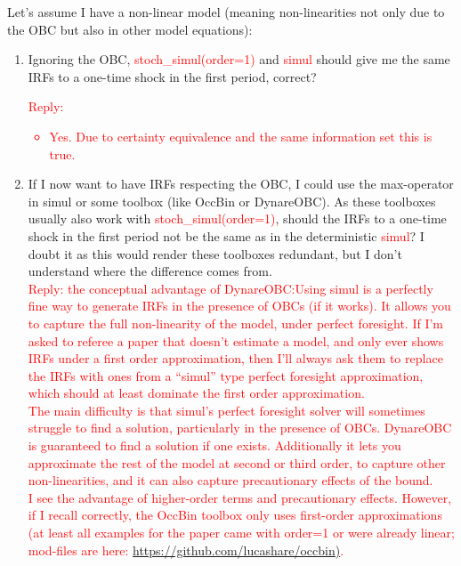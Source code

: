 \documentclass[10pt,math=newtx,citestyle=gb7714-2015,bibstyle=gb7714-2015]{elegantbook}
\begin{document}
{{{	Let’s assume I have a non-linear model (meaning non-linearities not only due to the OBC but also in other model equations):\\
	\begin{enumerate}
		\item  Ignoring the OBC, \textcolor{red}{stoch\_simul(order=1)} and \textcolor{red}{simul} should give me the same IRFs to a one-time shock in the first period, correct?\\
		\textcolor{red}{Reply:
			\begin{itemize}
				\item Yes. Due to certainty equivalence and the same information set this is true.
			\end{itemize}
		}
		\item If I now want to have IRFs respecting the OBC, I could use the max-operator in simul or some toolbox (like OccBin or DynareOBC). As these toolboxes usually also work with \textcolor{red}{stoch\_simul(order=1)}, should the IRFs to a one-time shock in the first period not be the same as in the deterministic \textcolor{red}{simul}? I doubt it as this would render these toolboxes redundant, but I don’t understand where the difference comes from.\\
		\textcolor{red}{Reply: the conceptual advantage of DynareOBC:Using simul is a perfectly fine way to generate IRFs in the presence of OBCs (if it works). It allows you to capture the full non-linearity of the model, under perfect foresight. If I’m asked to referee a paper that doesn’t estimate a model, and only ever shows IRFs under a first order approximation, then I’ll always ask them to replace the IRFs with ones from a “simul” type perfect foresight approximation, which should at least dominate the first order approximation.\\
			The main difficulty is that simul’s perfect foresight solver will sometimes struggle to find a solution, particularly in the presence of OBCs. DynareOBC is guaranteed to find a solution if one exists. Additionally it lets you approximate the rest of the model at second or third order, to capture other non-linearities, and it can also capture precautionary effects of the bound.\\
			I see the advantage of higher-order terms and precautionary effects. However, if I recall correctly, the OccBin toolbox only uses first-order approximations (at least all examples for the paper came with order=1 or were already linear; mod-files are here: \url{https://github.com/lucashare/occbin)}.\\
}
\end{enumerate}}}}
\end{document}
